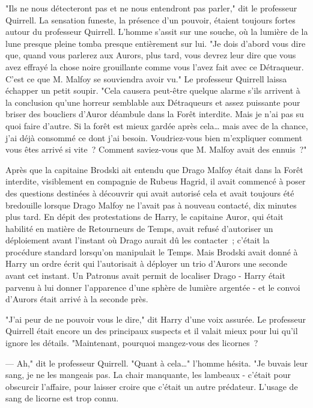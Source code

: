 "Ils ne nous détecteront pas et ne nous entendront pas parler," dit le professeur Quirrell. La sensation funeste, la présence d'un pouvoir, étaient toujours fortes autour du professeur Quirrell. L'homme s'assit sur une souche, où la lumière de la lune presque pleine tomba presque entièrement sur lui. "Je dois d'abord vous dire que, quand vous parlerez aux Aurors, plus tard, vous devrez leur dire que vous avez effrayé la chose noire grouillante comme vous l'avez fait avec ce Détraqueur. C'est ce que M. Malfoy se souviendra avoir vu." Le professeur Quirrell laissa échapper un petit soupir. "Cela causera peut-être quelque alarme s'ils arrivent à la conclusion qu'une horreur semblable aux Détraqueurs et assez puissante pour briser des boucliers d'Auror déambule dans la Forêt interdite. Mais je n'ai pas su quoi faire d'autre. Si la forêt est mieux gardée après cela… mais avec de la chance, j'ai déjà consommé ce dont j'ai besoin. Voudriez-vous bien m'expliquer comment vous êtes arrivé si vite~? Comment saviez-vous que M. Malfoy avait des ennuis~?"

Après que la capitaine Brodski ait entendu que Drago Malfoy était dans la Forêt interdite, visiblement en compagnie de Rubeus Hagrid, il avait commencé à poser des questions destinées à découvrir qui avait autorisé cela et avait toujours été bredouille lorsque Drago Malfoy ne l'avait pas à nouveau contacté, dix minutes plus tard. En dépit des protestations de Harry, le capitaine Auror, qui était habilité en matière de Retourneurs de Temps, avait refusé d'autoriser un déploiement avant l'instant où Drago aurait dû les contacter~; c'était la procédure standard lorsqu'on manipulait le Temps. Mais Brodski avait donné à Harry un ordre écrit qui l'autorisait à déployer un trio d'Aurors une seconde avant cet instant. Un Patronus avait permit de localiser Drago - Harry était parvenu à lui donner l'apparence d'une sphère de lumière argentée - et le convoi d'Aurors était arrivé à la seconde près.

"J'ai peur de ne pouvoir vous le dire," dit Harry d'une voix assurée. Le professeur Quirrell était encore un des principaux suspects et il valait mieux pour lui qu'il ignore les détails. "Maintenant, pourquoi mangez-vous des licornes~?

--- Ah," dit le professeur Quirrell. "Quant à cela…" l'homme hésita. "Je buvais leur sang, je ne les mangeais pas. La chair manquante, les lambeaux - c'était pour obscurcir l'affaire, pour laisser croire que c'était un autre prédateur. L'usage de sang de licorne est trop connu.

